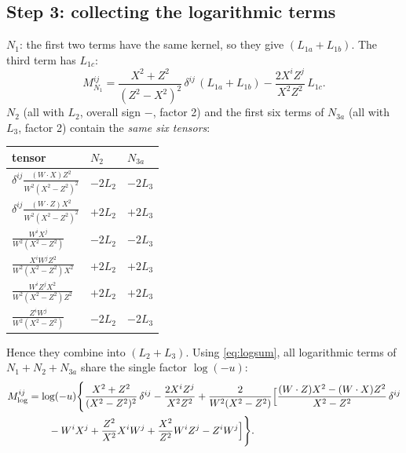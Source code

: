 \documentclass[10pt]{article}
\numberwithin{equation}{section}
\begin{document}
\subsection{Step 3: collecting the logarithmic terms}
$N_{1}$: the first two terms have the same kernel, so they give $(L_{1a}+L_{1b})$. The third term has $L_{1c}$:
\begin{equation}
M^{ij}_{N_{1}}=\frac{X^{2}+Z^{2}}{(Z^{2}-X^{2})^{2}}\,\delta^{ij}\,(L_{1a}+L_{1b})-\frac{2X^{i}Z^{j}}{X^{2}Z^{2}}\,L_{1c}.
\end{equation}
$N_{2}$ (all with $L_{2}$, overall sign $-$, factor 2) and the first six terms of $N_{3a}$ (all with $L_{3}$, factor 2) contain the \emph{same six tensors}:
\begin{center}
\begin{tabular}{lll}
\toprule
tensor & $N_{2}$ & $N_{3a}$\\\midrule
$\delta^{ij}\frac{(W\cdot X)Z^{2}}{W^{2}(X^{2}-Z^{2})^{2}}$ & $-2L_{2}$ & $-2L_{3}$\\
$\delta^{ij}\frac{(W\cdot Z)X^{2}}{W^{2}(X^{2}-Z^{2})^{2}}$ & $+2L_{2}$ & $+2L_{3}$\\
$\frac{W^{i}X^{j}}{W^{2}(X^{2}-Z^{2})}$ & $-2L_{2}$ & $-2L_{3}$\\
$\frac{X^{i}W^{j}Z^{2}}{W^{2}(X^{2}-Z^{2})X^{2}}$ & $+2L_{2}$ & $+2L_{3}$\\
$\frac{W^{i}Z^{j}X^{2}}{W^{2}(X^{2}-Z^{2})Z^{2}}$ & $+2L_{2}$ & $+2L_{3}$\\
$\frac{Z^{i}W^{j}}{W^{2}(X^{2}-Z^{2})}$ & $-2L_{2}$ & $-2L_{3}$\\\bottomrule
\end{tabular}
\end{center}
Hence they combine into $(L_{2}+L_{3})$. Using \eqref{eq:logsum}, all logarithmic terms of $N_{1}+N_{2}+N_{3a}$ share the single factor $\log(-u)$:
\begin{align}
M^{ij}_{\log}&=\log(-u)\Bigg\{\frac{X^{2}+Z^{2}}{(X^{2}-Z^{2})^{2}}\,\delta^{ij}-\frac{2X^{i}Z^{j}}{X^{2}Z^{2}}
+\frac{2}{W^{2}(X^{2}-Z^{2})}\Big[\frac{(W\cdot Z)X^{2}-(W\cdot X)Z^{2}}{X^{2}-Z^{2}}\,\delta^{ij}\notag\\
&\qquad-W^{i}X^{j}+\frac{Z^{2}}{X^{2}}X^{i}W^{j}+\frac{X^{2}}{Z^{2}}W^{i}Z^{j}-Z^{i}W^{j}\Big]\Bigg\}.
\end{align}
\end{document}
